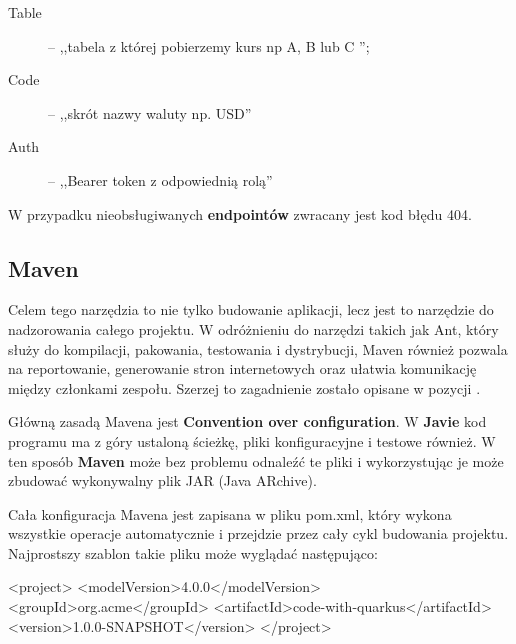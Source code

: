 \documentclass{iiuwb}
\begin{document}
\begin{description}
  \item[Table]  -- ,,tabela z której pobierzemy kurs np A, B lub C '';
  \item[Code] -- ,,skrót nazwy waluty np. USD''
  \item[Auth] -- ,,Bearer token z odpowiednią rolą''
\end{description}

W przypadku nieobsługiwanych \textbf{endpointów} zwracany jest kod błędu 404. \newline

\subsection{Maven}
\label{sec:Maven}

Celem tego narzędzia to nie tylko budowanie aplikacji, lecz jest to narzędzie do nadzorowania całego projektu. W odróżnieniu do narzędzi takich jak Ant, który służy do kompilacji, pakowania, testowania i dystrybucji, Maven również pozwala na reportowanie, generowanie stron internetowych oraz ułatwia komunikację między członkami zespołu. Szerzej to zagadnienie zostało opisane w pozycji \cite{Maven}.\newline

Główną zasadą Mavena jest \textbf{Convention over configuration}. W \textbf{Javie} kod programu ma z góry ustaloną ścieżkę, pliki konfiguracyjne i testowe również. W ten sposób \textbf{Maven} może bez problemu odnaleźć te pliki i wykorzystując je może zbudować wykonywalny plik JAR (Java ARchive).

Cała konfiguracja Mavena jest zapisana w pliku pom.xml, który wykona wszystkie operacje automatycznie i przejdzie przez cały cykl budowania projektu. Najprostszy szablon takie pliku może wyglądać następująco: 

<project>
  <modelVersion>4.0.0</modelVersion>
  <groupId>org.acme</groupId>
  <artifactId>code-with-quarkus</artifactId>
  <version>1.0.0-SNAPSHOT</version>
</project>
\end{document}
